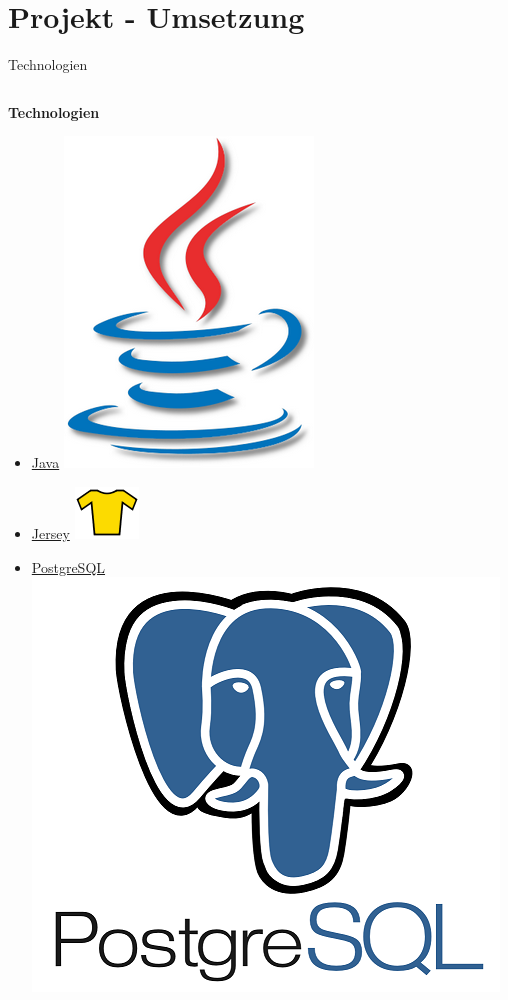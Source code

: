 \documentclass[ucs,9pt]{beamer}
\begin{document}
\section{Projekt - Umsetzung}
\begin{frame}{Technologien}
	\begin{columns}[c] %
  		\begin{column}[T]{0.49\textwidth} %
			\textbf{Technologien}
			\begin{itemize}
				\item \href{http://www.java.com/en/}{Java} \includegraphics[scale=0.08]{javalogo.png}
				\item \href{https://jersey.java.net/}{Jersey} \includegraphics[scale=0.5]{jerseylogo.png} 
				\item \href{http://www.postgresql.org/}{PostgreSQL} \includegraphics[scale=0.08]{postgresqllogo.png}

\end{itemize}
\end{column}
\end{columns}
\end{frame}
\end{document}
